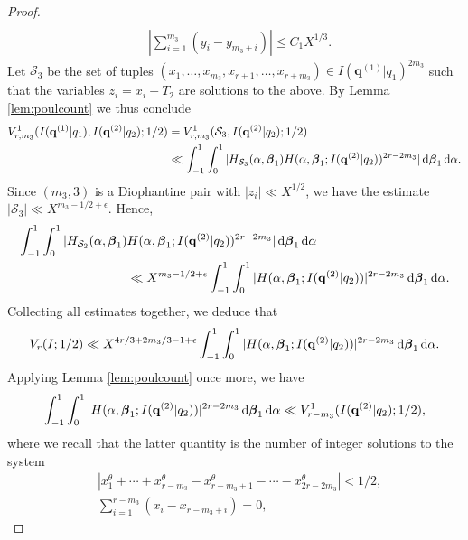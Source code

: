 \documentclass[11pt,reqno]{amsart}
\numberwithin{equation}{section}
\renewcommand{\d}{\,{\rm d}}
\begin{document}
\begin{proof}
\begin{align*}
\\ 
& |\sum_{i=1}^{m_3} (y_i-y_{m_3+i})| \leq C_1X^{1/3}. 
\end{align*}
Let $\mathcal{S}_3$ be the set of tuples $(x_1,\ldots, x_{m_3},x_{r+1},\ldots, x_{r+m_3}) \in I(\mathbf{q}^{(1)}|q_1)^{2m_3}$ such that the variables $z_i = x_i-T_2$ are solutions to the above. By Lemma \ref{lem:poulcount} we thus conclude 
\begin{align*} 
V_{r,m_3}^1(I(\mathbf{q}^{(1)}|q_1), I(\mathbf{q}^{(2)}|q_2);1/2) & = V_{r,m_3}^1(\mathcal{S}_3, I(\mathbf{q}^{(2)}|q_2);1/2)
\\ 
& \ll \int_{-1}^{1} \int_0^1 |H_{\mathcal{S}_3}(\alpha,\boldsymbol{\beta}_1)H(\alpha,\boldsymbol{\beta}_1;I(\mathbf{q}^{(2)}|q_2))^{2r-2m_3}| \d \boldsymbol{\beta}_1 \d \alpha.
\end{align*}
Since $(m_3,3)$ is a Diophantine pair with $|z_i| \ll X^{1/2}$, we have the estimate $ |\mathcal{S}_3| \ll X^{m_3-1/2+\epsilon}$. Hence, 
\begin{align*} 
\int_{-1}^{1} \int_0^1 |H_{\mathcal{S}_2}(\alpha,\boldsymbol{\beta}_1) & H(\alpha,\boldsymbol{\beta}_1;I(\mathbf{q}^{(2)}|q_2))^{2r-2m_3}| \d \boldsymbol{\beta}_1 \d \alpha 
\\ 
& \ll X^{m_3-1/2+\epsilon} \int_{-1}^{1} \int_0^1 |H(\alpha,\boldsymbol{\beta}_1;I(\mathbf{q}^{(2)}|q_2))|^{2r-2m_3} \d \boldsymbol{\beta}_1 \d \alpha. 
\end{align*}
Collecting all estimates together, we deduce that 
\begin{align*}
V_r(I;1/2) \ll X^{ 4r/3+2m_3/3-1+\epsilon}\int_{-1}^{1} \int_0^1 |H(\alpha,\boldsymbol{\beta}_1;I(\mathbf{q}^{(2)}|q_2))|^{2r-2m_3} \d \boldsymbol{\beta}_1 \d \alpha. 
\end{align*}
Applying Lemma \ref{lem:poulcount} once more, we have 
\begin{align*} 
\int_{-1}^{1} \int_0^1 |H(\alpha,\boldsymbol{\beta}_1;I(\mathbf{q}^{(2)}|q_2))|^{2r-2m_3} \d \boldsymbol{\beta}_1 \d \alpha \ll V_{r-m_3}^1(I(\mathbf{q}^{(2)}|q_2);1/2), 
\end{align*}
where we recall that the latter quantity is the number of integer solutions to the system 
\begin{equation} \label{eq:deg1minus4}
\begin{aligned}
& |x_1^{\theta}+\cdots+x_{r-m_3}^{\theta}-x_{r-m_3+1}^{\theta}-\cdots-x_{2r-2m_3}^{\theta}| < 1/2, 
\\ 
& \sum_{i=1}^{r-m_3} (x_i-x_{r-m_3+i}) = 0, 
\end{aligned}
\end{equation}

\end{proof}
\end{document}
